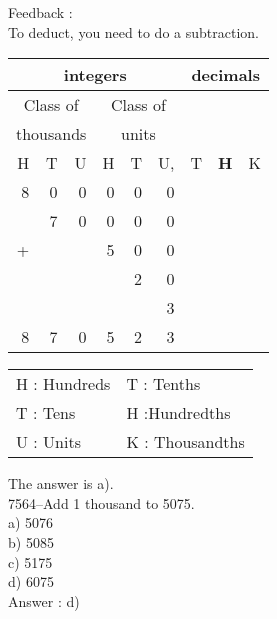 \documentclass[letterpaper, 12pt]{article}
\begin{document}
Feedback :\\
To deduct, you need to do a subtraction.
\begin{center}
\begin{tabular}{|rrr|rrr|rrr|}
\hline
\multicolumn{6}{|c|}{integers} &\multicolumn{3}{|c|}{decimals} \\
\hline
\multicolumn{3}{|c|}{Class of} &\multicolumn{3}{|c|}{Class of} &  \multicolumn{3}{c|}{} \\
\multicolumn{3}{|c|}{thousands} &\multicolumn{3}{|c|}{units} &  \multicolumn{3}{c|}{} \\
\hline
H & T & U &H & T & U, & T\up{th} & \textbf{H\up{th}} & K\up{th} \\
\hline
\hline
8 & 0 & 0 & 0 & 0 & 0 &  & &\\
 & 7 & 0 & 0 & 0 & 0 &  & &\\
+ &  &  & 5 & 0 & 0 &  & &\\
 &  &  &  & 2 & 0 &  & &\\
 &  &  &  &  & 3 &  & &\\
\hline
\hline
 8 & 7 & 0 & 5 & 2 & 3 &  & &
\\
\hline
\end{tabular}
\end{center}

\scriptsize
\begin{center}
\begin{tabular}{ll}
H : Hundreds & T\up{th} : Tenths\\
T : Tens & H\up{th} :Hundredths\\
U : Units & K\up{e} : Thousandths\\
\end{tabular}
\end{center}

\normalsize
The answer is a).\\






7564--Add 1 thousand to 5075.\\

a) 5076\\
b) 5085\\
c) 5175\\
d) 6075\\

Answer : d)\\
\end{document}
